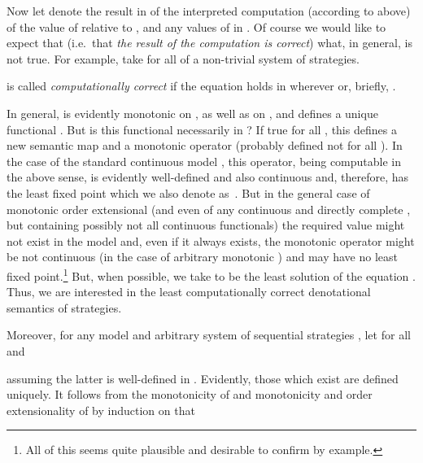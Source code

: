 \documentclass[fleqn]{LMCS}
\theoremstyle{plain}\newtheorem{satz}[thm]{Satz}
\theoremstyle{plain}\newtheorem{hyp}[thm]{Hypothesis}
\theoremstyle{plain}\newtheorem{hyps}[thm]{Hypotheses}
\theoremstyle{definition}\newtheorem{note}[thm]{Note}
\newcommand{\?}{\mbox{?}}
\begin{document}
Now let  denote 
the result  in  of the interpreted 
computation (according to  above) 
of the value of  
relative to ,  and any values of  in . 
Of course we would like to expect that  
(i.e.\ that \emph{the result of the computation is correct}) 
what, in general, 
is not true. For example, take  for all  of a non-trivial 
system of strategies. 
\begin{defi} is called \emph{computationally correct} if 
the equation  holds in  wherever  
or, briefly, . 
\end{defi}
In general, 
is evidently monotonic on  
\label{page:monotonic}, as well as on , 
and defines 
a unique functional 
. 
But is this functional necessarily in 
?
If true for all , this defines a new semantic map 
 and 
a monotonic operator \mbox{} 
(probably defined not for all ). 
In the case of the standard 
continuous model , this operator, 
being computable in the above sense, is evidently 
well-defined and also continuous 
and, therefore, has the least fixed point which we 
also denote as~. 
But in the general case of monotonic 
order extensional  (and even of any continuous 
and directly complete 
, but containing possibly not all continuous functionals)
the required value  might not exist in the model
and, even if 
it always exists, the 
monotonic operator  
might be not continuous (in the case of arbitrary monotonic 
) and may have no least fixed point.\footnote{All of this seems quite plausible and desirable to confirm by example.}
But, when possible, we 
take  to be the least solution of the 
equation . 
Thus, we are interested in the least computationally correct 
denotational semantics of strategies. 


Moreover, for any model  
and arbitrary system of sequential strategies ,
let  
for all  
and 
 
assuming the latter is 
well-defined in . 
Evidently, those  which exist are defined uniquely. 
It follows from the monotonicity of  and monotonicity and order extensionality 
of  by induction on  that 
 
\end{document}
